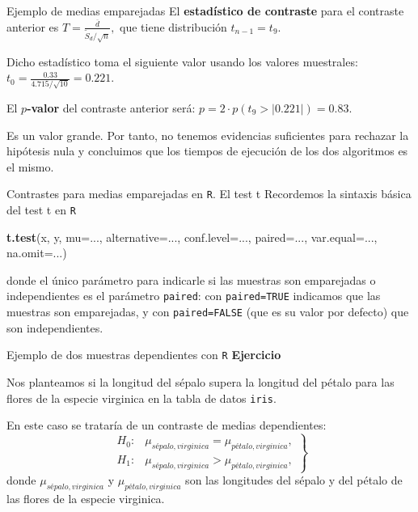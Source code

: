 \documentclass[
  ignorenonframetext,
]{beamer}
\newenvironment{Shaded}{\begin{snugshade}}{\end{snugshade}}
\newcommand{\DataTypeTok}[1]{\textcolor[rgb]{0.13,0.29,0.53}{#1}}
\newcommand{\KeywordTok}[1]{\textcolor[rgb]{0.13,0.29,0.53}{\textbf{#1}}}
\newcommand{\NormalTok}[1]{#1}
\begin{document}
\begin{frame}{Ejemplo de medias emparejadas}
\protect\hypertarget{ejemplo-de-medias-emparejadas-2}{}
El \textbf{estadístico de contraste} para el contraste anterior es
\(T=\frac{\overline{d}}{\widetilde{S}_d/\sqrt{n}},\) que tiene
distribución \(t_{n-1}=t_{9}\).

Dicho estadístico toma el siguiente valor usando los valores muestrales:
\(t_0=\frac{0.33}{4.715/\sqrt{10}}=0.221.\)

El \textbf{\(p\)-valor} del contraste anterior será:
\(p=2\cdot p(t_{9} > |0.221|) =0.83.\)

Es un valor grande. Por tanto, no tenemos evidencias suficientes para
rechazar la hipótesis nula y concluimos que los tiempos de ejecución de
los dos algoritmos es el mismo.
\end{frame}

\begin{frame}[fragile]{Contrastes para medias emparejadas en \texttt{R}.
El test t}
\protect\hypertarget{contrastes-para-medias-emparejadas-en-r.-el-test-t}{}
Recordemos la sintaxis básica del test t en \texttt{R}

\begin{Shaded}
\begin{Highlighting}[]
\KeywordTok{t.test}\NormalTok{(x, y, }\DataTypeTok{mu=}\NormalTok{..., }\DataTypeTok{alternative=}\NormalTok{..., }\DataTypeTok{conf.level=}\NormalTok{..., }\DataTypeTok{paired=}\NormalTok{..., }
       \DataTypeTok{var.equal=}\NormalTok{..., }\DataTypeTok{na.omit=}\NormalTok{...)}
\end{Highlighting}
\end{Shaded}

donde el único parámetro para indicarle si las muestras son emparejadas
o independientes es el parámetro \texttt{paired}: con
\texttt{paired=TRUE} indicamos que las muestras son emparejadas, y con
\texttt{paired=FALSE} (que es su valor por defecto) que son
independientes.
\end{frame}

\begin{frame}[fragile]{Ejemplo de dos muestras dependientes con
\texttt{R}}
\protect\hypertarget{ejemplo-de-dos-muestras-dependientes-con-r}{}
\textbf{Ejercicio}

Nos planteamos si la longitud del sépalo supera la longitud del pétalo
para las flores de la especie virginica en la tabla de datos
\texttt{iris}.

En este caso se trataría de un contraste de medias dependientes: \[
\left.
\begin{array}{ll}
H_0: & \mu_{{sépalo,virginica}} =\mu_{{pétalo,virginica}}, \\
H_1: & \mu_{{sépalo,virginica}} > \mu_{{pétalo,virginica}},
\end{array}
\right\}
\] donde \(\mu_{{sépalo,virginica}}\) y \(\mu_{{pétalo,virginica}}\) son
las longitudes del sépalo y del pétalo de las flores de la especie
virginica.
\end{frame}
\end{document}
